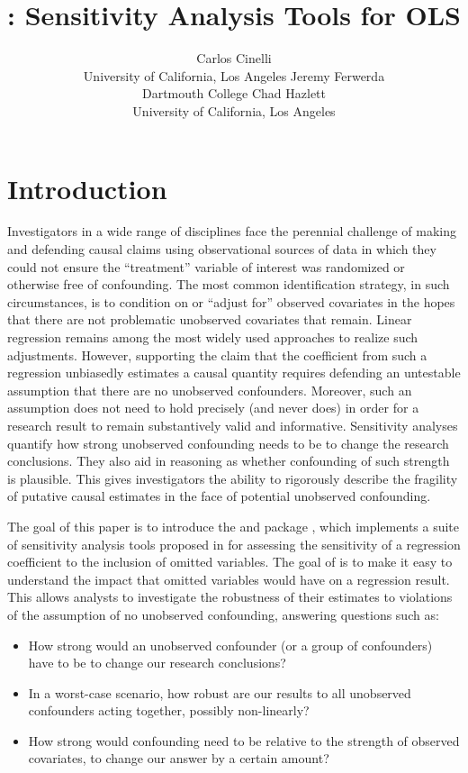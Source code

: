 \documentclass[
]{jss}
\author{
Carlos Cinelli\\University of California, Los Angeles \And Jeremy Ferwerda\\Dartmouth College \And Chad Hazlett\\University of California, Los Angeles
}
\title{\pkg{sensemakr}: Sensitivity Analysis Tools for OLS}
\begin{document}
\hypertarget{intro}{%
\section{Introduction}\label{intro}}

Investigators in a wide range of disciplines face the perennial
challenge of making and defending causal claims using observational
sources of data in which they could not ensure the ``treatment''
variable of interest was randomized or otherwise free of confounding.
The most common identification strategy, in such circumstances, is to
condition on or ``adjust for'' observed covariates in the hopes that
there are not problematic unobserved covariates that remain. Linear
regression remains among the most widely used approaches to realize such
adjustments. However, supporting the claim that the coefficient from
such a regression unbiasedly estimates a causal quantity requires
defending an untestable assumption that there are no unobserved
confounders. Moreover, such an assumption does not need to hold
precisely (and never does) in order for a research result to remain
substantively valid and informative. Sensitivity analyses quantify how
strong unobserved confounding needs to be to change the research
conclusions. They also aid in reasoning as whether confounding of such
strength is plausible. This gives investigators the ability to
rigorously describe the fragility of putative causal estimates in the
face of potential unobserved confounding.

The goal of this paper is to introduce the  and
 package 
\citep{sensemakr:R,sensemakr:stata}, which implements a suite of
sensitivity analysis tools proposed in \citet{cinelli:jrssb2019} for
assessing the sensitivity of a regression coefficient to the inclusion
of omitted variables. The goal of  is to make it easy to
understand the impact that omitted variables would have on a regression
result. This allows analysts to investigate the robustness of their
estimates to violations of the assumption of no unobserved confounding,
answering questions such as:

\begin{itemize}
\item
  How strong would an unobserved confounder (or a group of confounders)
  have to be to change our research conclusions?
\item
  In a worst-case scenario, how robust are our results to all unobserved
  confounders acting together, possibly non-linearly?
\item
  How strong would confounding need to be relative to the strength of
  observed covariates, to change our answer by a certain amount?
\end{itemize}
\end{document}
